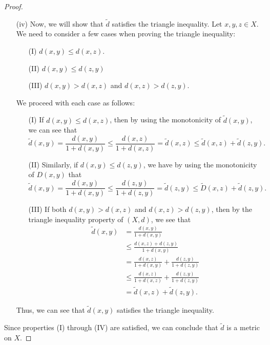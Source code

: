 \documentclass[a4paper]{article}
\begin{document}
\begin{proof}
\begin{enumerate}
\begin{enumerate}
            \end{enumerate}
        \item[(iv)] Now, we will show that \( \tilde{d} \) satisfies the triangle inequality. Let \( x,y,z \in X  \).
We need to consider a few cases when proving the triangle inequality:
            \begin{enumerate}
                \item[(I)] \( d(x,y) \leq d(x,z) \).
                \item[(II)] \( d(x,y) \leq d(z,y) \)
                \item[(III)] \( d(x,y) > d(x,z) \) and \( d(x,z) > d(z,y) \).
            \end{enumerate}
            We proceed with each case as follows:
            \begin{enumerate}
                \item[(I)] If \( d(x,y) \leq d(x,z) \), then by using the monotonicity of \( \tilde{d}(x,y) \), we can see that 
                    \[  \tilde{d}(x,y) = \frac{ d(x,y) }{ 1 + d(x,y) } \leq \frac{ d(x,z) }{ 1 + d(x,z) } = \tilde{d}(x,z) \leq \tilde{d}(x,z) + \tilde{d}(z,y). \]
                \item[(II)] Similarly, if \( d(x,y) \leq d(z,y) \), we have by using the monotonicity of \( D(x,y) \) that
                    \[  \tilde{d}(x,y) = \frac{ d(x,y) }{  1 + d(x,y) } \leq \frac{ d(z,y) }{ 1 + d(z,y) } = \tilde{d}(z,y) \leq \tilde{D}(x,z) + \tilde{d}(z,y). \]
                \item[(III)] If both \( d(x,y) > d(x,z) \) and \( d(x,z) > d(z,y) \), then by the triangle inequality property of \( (X,d) \), we see that                   
                    \begin{align*}
                        \tilde{d}(x,y) &= \frac{ d(x,y) }{ 1 + d(x,y) }  \\
                           &\leq \frac{ d(x,z) + d(z,y)  }{ 1 + d(x,y) } \\
                           &= \frac{ d(x,z) }{ 1 + d(x,y)  }  + \frac{ d(z,y) }{ 1 + d(z,y) } \\
                           &\leq \frac{ d(x,z) }{ 1 + d(x,z) }  + \frac{ d(z,y) }{ 1 + d(z,y) } \\
                           &= \tilde{d}(x,z) + \tilde{d}(z,y).
                \end{align*} 
            \end{enumerate}
            Thus, we can see that \( \tilde{d}(x,y) \) satisfies the triangle inequality.
\end{enumerate}
Since properties (I) through (IV) are satisfied, we can conclude that \( \tilde{d} \) is a metric on \( X  \).
\end{proof}
\end{document}
